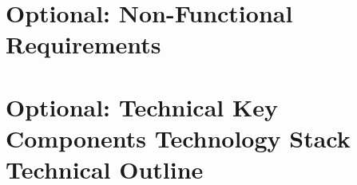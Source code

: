 \documentclass[conference,a4paper]{cs-techrep}
\begin{document}
\section{Optional: Non-Functional Requirements}
\lipsum[3]

\section{Optional: Technical Key Components \textbar{} Technology Stack \textbar{} Technical Outline}
\lipsum[4]


\nocite{ModA-TR-2023SS-WAE-TeamWeiss-Neunerln}
\nocite{ModA-TR-2023SS-BDCC-TeamRot-CompVisPipeline}
\nocite{ModA-TR-2023SS-BDCC-TeamBlau-NauticalNonsense}
\nocite{ModA-TR-2023SS-BCN-TeamGruen-TorpedoTactics}
\nocite{ModA-TR-2023SS-BCN-TeamCyan-Stockbird}
\nocite{ModA-TR-2023SS-BCN-TeamBlau-FancyChess}
\nocite{ModA-TR-2023WS-SWT-TeamRot-SGDb}
\nocite{ModA-TR-2023WS-SWT-TeamGruen-OPCUANetzwerk}
\nocite{ModA-TR-2022SS-WAE-TeamWeiss-WoIstMeinGeld}
\nocite{ModA-TR-2022SS-BDCC-TeamWeiss-TwitterDash}
\nocite{ModA-TR-2022SS-BDCC-TeamRot-Reddiment}
\nocite{ModA-TR-2022SS-BDCC-TeamGruen-ExplosionGuy}
\nocite{ModA-TR-2022SS-BDCC-TeamCyan-OTHWiki}
\nocite{ModA-TR-2022WS-SWT-TeamGruen-Graphvio}
\nocite{ModA-TR-2021SS-WAE-TeamWeiss-CovidDashboard}
\nocite{ModA-TR-2021SS-WAE-TeamRot-FireForceDefense}
\nocite{ModA-TR-2021SS-WAE-TeamGruen-MedPlanner}

\sloppy
\printbibliography[notcategory=selfref]
\end{document}
